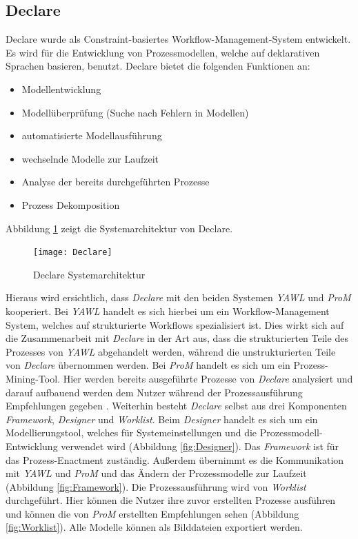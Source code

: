 \subsection{Declare}

Declare wurde als Constraint-basiertes Workflow-Management-System entwickelt. Es wird für die Entwicklung von Prozessmodellen, welche auf deklarativen Sprachen basieren, benutzt. Declare bietet die folgenden Funktionen an:
\begin {itemize}
\item Modellentwicklung
\item Modellüberprüfung (Suche nach Fehlern in Modellen)
\item automatisierte Modellausführung
\item wechselnde Modelle zur Laufzeit
\item Analyse der bereits durchgeführten Prozesse
\item Prozess Dekomposition
\end {itemize}

Abbildung \ref{fig:Declare} zeigt die Systemarchitektur von Declare.

\begin{figure}[H]
\begin{center}
  \texttt{[image: Declare]} %
  \caption{Declare Systemarchitektur}
  \label{fig:Declare}
\end{center}
\end{figure} 

Hieraus wird ersichtlich, dass \textit{Declare} mit den beiden Systemen \textit{YAWL} und \textit{ProM} kooperiert. Bei \textit{YAWL} handelt es sich hierbei um ein Workflow-Management System, welches auf strukturierte Workflows spezialisiert ist. Dies wirkt sich auf die Zusammenarbeit mit \textit{Declare} in der Art aus, dass die strukturierten Teile des Prozesses von \textit{YAWL} abgehandelt werden, während die unstrukturierten Teile von \textit{Declare} übernommen werden. Bei \textit{ProM} handelt es sich um ein Prozess-Mining-Tool. Hier werden bereits ausgeführte Prozesse von \textit{Declare} analysiert und darauf aufbauend werden dem Nutzer während der Prozessausführung Empfehlungen gegeben \cite{pesic2007declare}. \newline
Weiterhin besteht \textit{Declare} selbst aus drei Komponenten \textit{Framework}, \textit{Designer} und \textit{Worklist}.  Beim \textit{Designer} handelt es sich um ein Modellierungstool, welches für Systemeinstellungen und die Prozessmodell-Entwicklung verwendet wird (Abbildung \ref{fig:Designer}). Das \textit{Framework} ist für das Prozess-Enactment zuständig. Außerdem übernimmt es die Kommunikation mit \textit{YAWL} und \textit{ProM} und das Ändern der Prozessmodelle zur Laufzeit (Abbildung \ref{fig:Framework}). Die Prozessausführung wird von \textit{Worklist} durchgeführt. Hier können die Nutzer ihre zuvor erstellten Prozesse ausführen und können die von \textit{ProM} erstellten Empfehlungen sehen (Abbildung \ref{fig:Worklist}). Alle Modelle können als Bilddateien exportiert werden.



